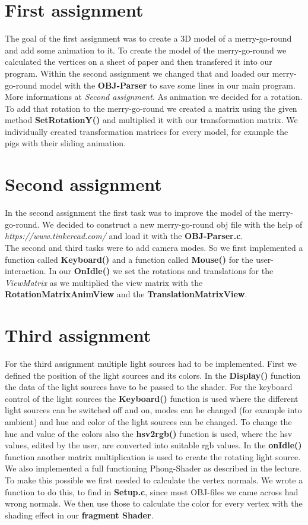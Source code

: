\documentclass[a4paper, 12pt]{article}
\begin{document}
\section{First assignment}
The goal of the first assignment was to create a 3D model of a merry-go-round and add some animation to it. To create the model of the merry-go-round we calculated the vertices on a sheet of paper and then transfered it into our program. Within the second assignment we changed that and loaded our merry-go-round model with the \textbf{OBJ-Parser} to save some lines in our main program. More informations at \textit{Second assignment}. As animation we decided for a rotation. To add that rotation to the merry-go-round we created a matrix using the given method \textbf{SetRotationY()} and multiplied it with our transformation matrix. We individually created transformation matrices for every model, for example the pigs with their sliding animation. 
\newpage
\section{Second assignment}
In the second assignment the first task was to improve the model of the merry-go-round. We decided to construct a new merry-go-round obj file with the help of \textit{https://www.tinkercad.com/} and load it with the \textbf{OBJ-Parser.c}. \\
The second and third tasks were to add camera modes. So we first implemented a function called \textbf{Keyboard()} and a function called \textbf{Mouse()} for the user-interaction. In our \textbf{OnIdle()} we set the rotations and translations for the \textit{ViewMatrix} as we multiplied the view matrix with the \textbf{RotationMatrixAnimView} and the \textbf{TranslationMatrixView}.
\section{Third assignment}
For the third assignment multiple light sources had to be implemented. First we defined the position of the light sources and its colors. In the \textbf{Display()} function the data of the light sources have to be passed to the shader. For the keyboard control of the light sources the \textbf{Keyboard()} function is used where the different light sources can be switched off and on, modes can be changed (for example into ambient) and hue and color of the light sources can be changed. To change the hue and value of the colors also the \textbf{hsv2rgb()} function is used, where the hsv values, edited by the user, are converted into suitable rgb values. In the \textbf{onIdle()} function another matrix multiplication is used to create the rotating light source.
We also implemented a full functioning Phong-Shader as described in the lecture. To make this possible we first needed to calculate the vertex normals. We wrote a function to do this, to find in \textbf{Setup.c}, since most OBJ-files we came across had wrong normals. We then use those to calculate the color for every vertex with the shading effect in our \textbf{fragment Shader}. 
\end{document}

